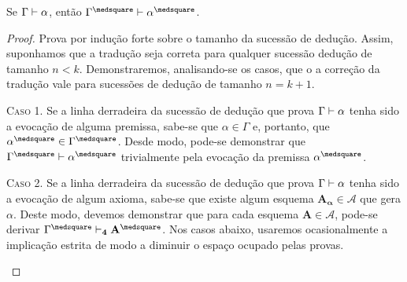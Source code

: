     \begin{theorem}\label{square-correctness}
        Se $\Gamma\mathrel{\vdash}\alpha$, então $\Gamma^\medsquare\entails\alpha^\medsquare$.
    \end{theorem}

    \begin{proof}
        Prova por indução forte sobre o tamanho da sucessão de dedução.
        Assim, suponhamos que a tradução seja correta para qualquer sucessão dedução de tamanho $n<k$.
        Demonstraremos, analisando-se os casos, que o a correção da tradução vale para sucessões de dedução de tamanho $n=k+1$.

        \begin{case}
            \textsc{Caso 1.}
            Se a linha derradeira da sucessão de dedução que prova $\Gamma\mathrel{\vdash}\alpha$ tenha sido a evocação de alguma premissa, sabe-se que $\alpha\in\Gamma$ e, portanto, que $\alpha^\medsquare\in\Gamma^\medsquare$. Desde modo, pode-se demonstrar que $\Gamma^\medsquare\entails\alpha^\medsquare$ trivialmente pela evocação da premissa $\alpha^\medsquare$.
        \end{case}

        \begin{case}
            \textsc{Caso 2.}
            Se a linha derradeira da sucessão de dedução que prova $\Gamma\mathrel{\vdash}\alpha$ tenha sido a evocação de algum axioma, sabe-se que existe algum esquema $\mathbf{A_\alpha}\in\mathcal{A}$ que gera $\alpha$. Deste modo, devemos demonstrar que para cada esquema $\mathbf{A}\in\mathcal{A}$, pode-se derivar $\Gamma^\medsquare\entails_\mathbf{4}\mathbf{A}^\medsquare$. Nos casos abaixo, usaremos ocasionalmente a implicação estrita de modo a diminuir o espaço ocupado pelas provas.
        \end{case}


\end{proof}
